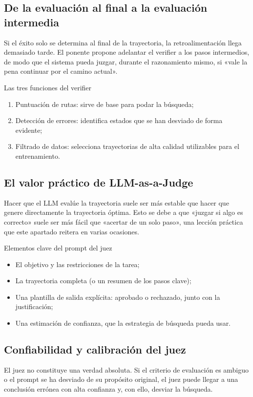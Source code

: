 \documentclass[a4paper]{article}
\begin{document}
\subsection{De la evaluación al final a la evaluación intermedia}
Si el éxito solo se determina al final de la trayectoria, la retroalimentación llega demasiado tarde. El ponente propone adelantar el verifier a los pasos intermedios, de modo que el sistema pueda juzgar, durante el razonamiento mismo, si «vale la pena continuar por el camino actual».

\begin{importantbox}{Las tres funciones del verifier}
\begin{enumerate}
    \item Puntuación de rutas: sirve de base para podar la búsqueda;
    \item Detección de errores: identifica estados que se han desviado de forma evidente;
    \item Filtrado de datos: selecciona trayectorias de alta calidad utilizables para el entrenamiento.
\end{enumerate}
\end{importantbox}

\subsection{El valor práctico de LLM-as-a-Judge}
Hacer que el LLM evalúe la trayectoria suele ser más estable que hacer que genere directamente la trayectoria óptima. Esto se debe a que «juzgar si algo es correcto» suele ser más fácil que «acertar de un solo paso», una lección práctica que este apartado reitera en varias ocasiones.

\begin{knowledgebox}{Elementos clave del prompt del juez}
\begin{itemize}
    \item El objetivo y las restricciones de la tarea;
    \item La trayectoria completa (o un resumen de los pasos clave);
    \item Una plantilla de salida explícita: aprobado o rechazado, junto con la justificación;
    \item Una estimación de confianza, que la estrategia de búsqueda pueda usar.
\end{itemize}
\end{knowledgebox}

\subsection{Confiabilidad y calibración del juez}
El juez no constituye una verdad absoluta. Si el criterio de evaluación es ambiguo o el prompt se ha desviado de su propósito original, el juez puede llegar a una conclusión errónea con alta confianza y, con ello, desviar la búsqueda.
\end{document}
